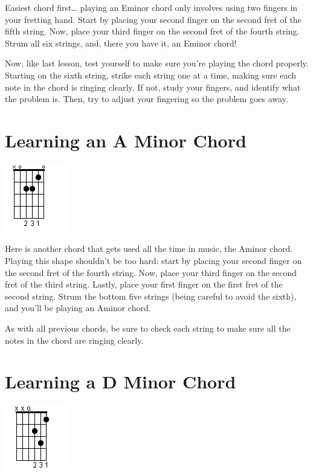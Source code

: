 Easiest chord first\ldots{} playing an Eminor chord only involves using two fingers
in your fretting hand. Start by placing your second finger on the second fret
of the fifth string. Now, place your third finger on the second fret of the
fourth string. Strum all six strings, and, there you have it, an Eminor chord!

Now, like last lesson, test yourself to make sure you're playing the chord
properly. Starting on the sixth string, strike each string one at a time,
making sure each note in the chord is ringing clearly. If not, study your
fingers, and identify what the problem is. Then, try to adjust your fingering
so the problem goes away.

\section{Learning an A Minor Chord}
\includegraphics{parttwo/openaminor.png}

Here is another chord that gets used all the time in music, the Aminor chord.
Playing this shape shouldn't be too hard: start by placing your second finger
on the second fret of the fourth string. Now, place your third finger on the
second fret of the third string. Lastly, place your first finger on the first
fret of the second string. Strum the bottom five strings (being careful to
avoid the sixth), and you'll be playing an Aminor chord.

As with all previous chords, be sure to check each string to make sure all the
notes in the chord are ringing clearly.

\section{Learning a D Minor Chord}
\includegraphics{parttwo/opendminor.png}

